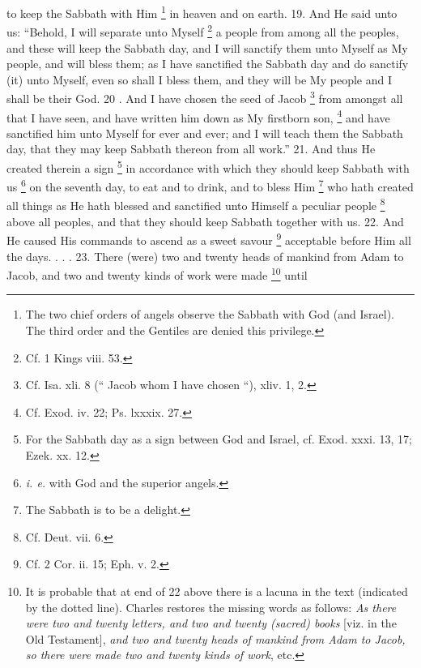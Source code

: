 to keep the Sabbath with Him \footnote{The two chief orders of angels observe the Sabbath with God (and Israel). The third order and the Gentiles are denied this privilege.} in heaven and on earth. 19. And He said unto us: ``Behold, I will separate unto Myself \footnote{Cf. 1 Kings viii. 53.} a people from among all the peoples, and these will keep the Sabbath day, and I will sanctify them unto Myself as My people, and will bless them; as I have sanctified the Sabbath day and do sanctify (it) unto Myself, even so shall I bless them, and they will be My people and I shall be their God. 20 . And I have chosen the seed of Jacob \footnote{Cf. Isa. xli. 8 (`` Jacob whom I have chosen ``), xliv. 1, 2.} from amongst all that I have seen, and have written him down as My firstborn son, \footnote{Cf. Exod. iv. 22; Ps. lxxxix. 27.} and have sanctified him unto Myself for ever and ever; and I will teach them the Sabbath day, that they may keep Sabbath thereon from all work.'' 21. And thus He created therein a sign \footnote{For the Sabbath day as a sign between God and Israel, cf. Exod. xxxi. 13, 17; Ezek. xx. 12.} in accordance with which they should keep Sabbath with us \footnote{\emph{i. e.} with God and the superior angels.} on the seventh day, to eat and to drink, and to bless Him \footnote{The Sabbath is to be a delight.} who hath created all things as He hath blessed and sanctified unto Himself a peculiar people \footnote{Cf. Deut. vii. 6.} above all peoples, and that they should keep Sabbath together with us. 22. And He caused His commands to ascend as a sweet savour \footnote{Cf. 2 Cor. ii. 15; Eph. v. 2.} acceptable before Him all the days. . . . 23. There (were) two and twenty heads of mankind from Adam to Jacob, and two and twenty kinds of work were made \footnote{It is probable that at end of 22 above there is a lacuna in the text (indicated by the dotted line). Charles restores the missing words as follows: \emph{As there were two and twenty letters, and two and twenty (sacred) books} [viz. in the Old Testament], \emph{and two and twenty heads of mankind from Adam to Jacob, so there were made two and twenty kinds of work}, etc.} until

